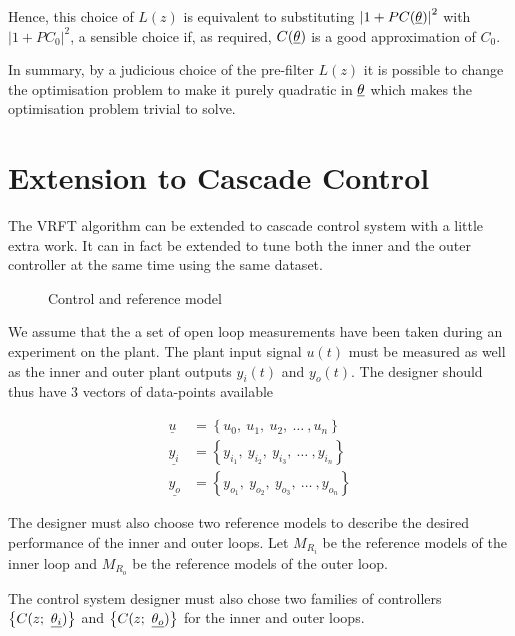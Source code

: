\noindent
Hence, this choice of \( L(z) \) is equivalent to substituting \( \left| 1 + PC(\underline{\theta}) \right|^2 \) with \( \left| 1 + PC_0 \right|^2 \), a sensible choice if, as required, \( C(\underline{\theta}) \) is a good approximation of \( C_0 \).

In summary, by a judicious choice of the pre-filter \( L(z) \) it is possible to change the optimisation problem to make it purely quadratic in \( \underline{\theta} \) which makes the optimisation problem trivial to solve. 

\section{Extension to Cascade Control}
\label{sec:vrft_cascade_control}

The VRFT algorithm can be extended to cascade control system with a little extra work. It can in fact be extended to tune both the inner and the outer controller at the same time using the same dataset.

\begin{figure}[!h]
    

    \caption{Control and reference model}
    \label{fig:vrft_cascade_bd}
\end{figure}

We assume that the a set of open loop measurements have been taken during an experiment on the plant. The plant input signal \( u(t) \) must be measured as well as the inner and outer plant outputs \( y_i(t) \) and \( y_o(t) \). The designer should thus have 3 vectors of data-points available

\begin{align*}
    \underline{u} &= \left\{ u_0,\ u_1,\ u_2,\ \ldots\ , u_n \right\} \\
    \underline{y_i} &= \left\{ y_{i_1},\ y_{i_2},\ y_{i_3},\ \ldots\ , y_{i_n} \right\} \\
    \underline{y_o} &= \left\{ y_{o_1},\ y_{o_2},\ y_{o_3},\ \ldots\ , y_{o_n} \right\}
\end{align*}

The designer must also choose two reference models to describe the desired performance of the inner and outer loops. Let \( M_{R_i} \) be the reference models of the inner loop and \( M_{R_o} \) be the reference models of the outer loop.

The control system designer must also chose two families of controllers \( \left\{ C(z;\ \underline{\theta_i}) \right\} \) and \( \left\{ C(z;\ \thetaveco) \right\} \) for the inner and outer loops. 

